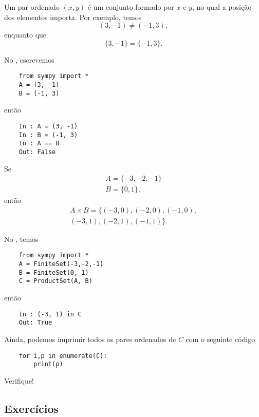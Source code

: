 \begin{obs}
  Um par ordenado $(x, y)$ é um conjunto formado por $x$ e $y$, no qual a posição dos elementos importa. Por exemplo, temos
  \begin{equation}
    (3, -1) \neq (-1, 3),
  \end{equation}
  enquanto que
  \begin{equation}
    \{3, -1\} = \{-1, 3\}.
  \end{equation}

  \ifispython
  No \python, escrevemos
  \begin{lstlisting}
    from sympy import *
    A = (3, -1)
    B = (-1, 3)
  \end{lstlisting}
  então
  \begin{lstlisting}
    In : A = (3, -1)
    In : B = (-1, 3)
    In : A == B
    Out: False
  \end{lstlisting}
  \fi
\end{obs}

\begin{ex}
  Se
  \begin{gather}
    A = \{-3, -2, -1\}\\
    B = \{0, 1\},
  \end{gather}
  então
  \begin{gather}
    A\times B = \{(-3,0), (-2, 0), (-1, 0),\nonumber\\
    (-3, 1), (-2, 1), (-1, 1)\}.
  \end{gather}

  \ifispython
  No \python, temos
  \begin{lstlisting}
    from sympy import *
    A = FiniteSet(-3,-2,-1)
    B = FiniteSet(0, 1)
    C = ProductSet(A, B)
  \end{lstlisting}
  então
  \begin{lstlisting}
    In : (-3, 1) in C 
    Out: True
  \end{lstlisting}
  Ainda, podemos imprimir todos os pares ordenados de $C$ com o seguinte código
  \begin{lstlisting}
    for i,p in enumerate(C):
        print(p)
  \end{lstlisting}
  Verifique!    
  \fi
\end{ex}

\subsection*{Exercícios}

